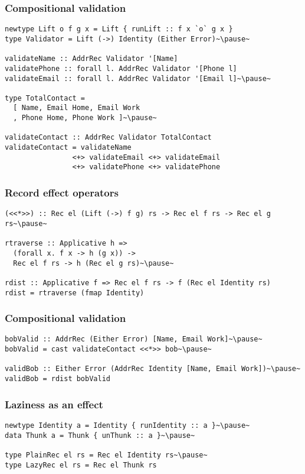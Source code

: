 \documentclass[tikz, 12pt]{beamer}
\begin{document}
\begin{frame}[fragile]
  \frametitle{Compositional validation}
  \begin{lstlisting}
newtype Lift o f g x = Lift { runLift :: f x `o` g x }
type Validator = Lift (->) Identity (Either Error)~\pause~

validateName :: AddrRec Validator '[Name]
validatePhone :: forall l. AddrRec Validator '[Phone l]
validateEmail :: forall l. AddrRec Validator '[Email l]~\pause~

type TotalContact =
  [ Name, Email Home, Email Work
  , Phone Home, Phone Work ]~\pause~

validateContact :: AddrRec Validator TotalContact
validateContact = validateName
                <+> validateEmail <+> validateEmail
                <+> validatePhone <+> validatePhone
  \end{lstlisting}
\end{frame}

\begin{frame}[fragile]
  \frametitle{Record effect operators}
  \begin{lstlisting}
(<<*>>) :: Rec el (Lift (->) f g) rs -> Rec el f rs -> Rec el g rs~\pause~

rtraverse :: Applicative h =>
  (forall x. f x -> h (g x)) ->
  Rec el f rs -> h (Rec el g rs)~\pause~

rdist :: Applicative f => Rec el f rs -> f (Rec el Identity rs)
rdist = rtraverse (fmap Identity)
  \end{lstlisting}
\end{frame}

\begin{frame}[fragile]
  \frametitle{Compositional validation}
  \begin{lstlisting}
bobValid :: AddrRec (Either Error) [Name, Email Work]~\pause~
bobValid = cast validateContact <<*>> bob~\pause~

validBob :: Either Error (AddrRec Identity [Name, Email Work])~\pause~
validBob = rdist bobValid
  \end{lstlisting}
\end{frame}

\begin{frame}[fragile]
  \frametitle{Laziness as an effect}\pause

  \begin{lstlisting}
newtype Identity a = Identity { runIdentity :: a }~\pause~
data Thunk a = Thunk { unThunk :: a }~\pause~

type PlainRec el rs = Rec el Identity rs~\pause~
type LazyRec el rs = Rec el Thunk rs
  \end{lstlisting}
\end{frame}
\end{document}
